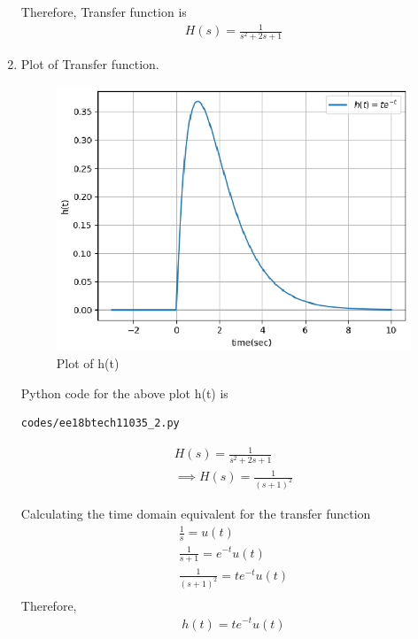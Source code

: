 \begin{enumerate}[label=\thesection.\arabic*.,ref=\thesection.\theenumi]
Therefore, Transfer function is 
\begin{align}
H(s) = \frac{1}{s^2+2s+1}
\end{align}

\item 
Plot of Transfer function.
\\ \solution  
\begin{figure}[!h]
\includegraphics[width=\columnwidth]{./figures/ee18btech11035_2.eps}
\caption{Plot of h(t)}
\label{fig:ee18btech11035_h(t)}
\end{figure}

Python code for the above plot h(t) is
\begin{lstlisting}
codes/ee18btech11035_2.py
\end{lstlisting}

\begin{align}
H(s) = \frac{1}{s^2+2s+1}\\
\implies H(s) = \frac{1}{(s+1)^2}
\end{align}

Calculating the time domain equivalent for the transfer function\\
\begin{align}
\label{eq:s}
\frac{1}{s} = u(t)\\
\label{eq:s+1}
\frac{1}{s+1} = e^{-t}u(t)\\
\label{eq:(s+1)^2}
\frac{1}{(s+1)^2} = te^{-t}u(t)\\
\end{align}
Therefore,
\begin{align}
h(t) = te^{-t}u(t)
\end{align}



\end{enumerate}
